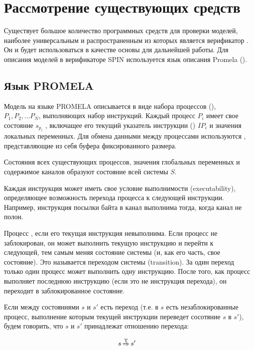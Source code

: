 \chapter{Рассмотрение существующих средств}
\label{cha:analogues}

Существует большое количество программных средств для проверки моделей, наиболее
универсальным и распространенным из которых является верификатор 
\cite{SpinRoot}. Он и будет использоваться в качестве основы для дальнейшей работы. Для
описания моделей в верификаторе SPIN используется язык описания Promela ().

\section{Язык PROMELA}
\label{sec:promela}

Модель на языке PROMELA описывается в виде набора процессов (), $P_1, P_2,
... P_N$, выполняющих набор инструкций. Каждый процесс $P_i$ имеет свое состояние
$s_{p_i}$ , включащее его текущий указатель инструкции () $IP_i$
и значения локальных переменных. Для обмена данными между процессами используются
, представляющие из себя буфера фиксированного размера.

Состояния всех существующих процессов, значения глобальных переменных и содержимое каналов
образуют состояние всей системы $S$.

Каждая инструкция может иметь свое условие выполнимости (executability), определяющее
возможность перехода процесса к следующей инструкции. Например, инструкция посылки байта в
канал выполнима тогда, когда канал не полон.

Процесс , если его текущая инструкция невыполнима. Если процесс не
заблокирован, он может выполнить текущую инструкцию и перейти к следующей, тем самым меняя
состояние системы (и, как его часть, свое состояние). Это называется переходом системы
(transition). За один переход только один процесс может выполнить одну инструкцию. После
того, как процесс выполняет последнюю инструкцию (если это не инструкция перехода), он
переходит в заблокированное состояние.

Если между состояниями $s$ и $s'$ есть переход (т.е. в $s$ есть незаблокированные процесс,
выполнение которым текущей инструкции переведет сосотяние $s$ в $s'$), будем говорить, что
$s$ и $s'$ принадлежат отношению перехода:

\begin{equation}
  \label{eq:statetrans-def}
  s \operatorname{\operatorname*{\Rightarrow}^T} s'
\end{equation}

